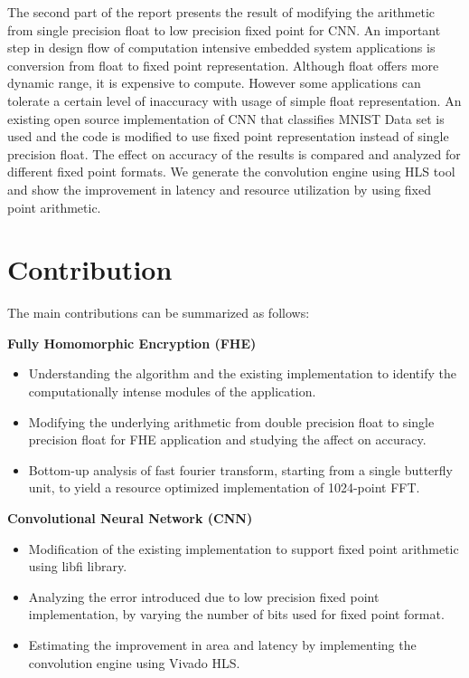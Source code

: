 The second part of the report presents the result of modifying the arithmetic from single precision float to low precision fixed point for CNN. An important step in design flow of computation intensive embedded system applications is conversion from float to fixed point representation. Although float offers more dynamic range, it is expensive to compute. However some applications can tolerate a certain level of inaccuracy with usage of simple float representation. 
An existing open source implementation of CNN that classifies MNIST Data set is used and the code is modified to use fixed point representation instead of single precision float. The effect on accuracy of the results is compared and analyzed for different fixed point formats. We generate the convolution engine using HLS tool and show the improvement in latency and resource utilization by using fixed point arithmetic. 



\section{Contribution}
The main contributions can be summarized as follows:

\vspace{0.25cm}
\textbf{Fully Homomorphic Encryption (FHE)}
\begin{itemize}
\item Understanding the algorithm and the existing implementation to identify the computationally intense modules of the application. 
\item Modifying the underlying arithmetic from double precision float to single precision float for FHE application and studying the affect on accuracy.
\item Bottom-up analysis of fast fourier transform, starting from a single butterfly unit, to yield a resource optimized implementation of 1024-point FFT.
\end{itemize}

\textbf{Convolutional Neural Network (CNN)}
\begin{itemize}
\item Modification of the existing implementation to support fixed point arithmetic using libfi library.
\item Analyzing the error introduced due to low precision fixed point implementation, by varying the number of bits used for fixed point format. 
\item Estimating the improvement in area and latency by implementing the convolution engine using Vivado HLS. 
\end{itemize}

